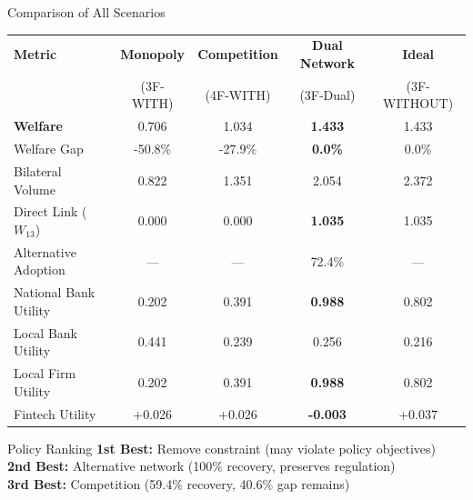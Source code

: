 \documentclass[aspectratio=169]{beamer}
\begin{document}
\begin{frame}{Comparison of All Scenarios}
    \begin{table}
        \centering
        \tiny
        \begin{tabular}{lcccc}
            \toprule
            \textbf{Metric} & \textbf{Monopoly} & \textbf{Competition} & \textbf{Dual Network} & \textbf{Ideal} \\
             & (3F-WITH) & (4F-WITH) & (3F-Dual) & (3F-WITHOUT) \\
            \midrule
            \textbf{Welfare} & 0.706 & 1.034 & \textbf{1.433} & 1.433 \\
            Welfare Gap & -50.8\% & -27.9\% & \textcolor{SafeGreen}{\textbf{0.0\%}} & 0.0\% \\
            \midrule
            Bilateral Volume & 0.822 & 1.351 & 2.054 & 2.372 \\
            Direct Link ($W_{13}$) & 0.000 & 0.000 & \textbf{1.035} & 1.035 \\
            Alternative Adoption & --- & --- & 72.4\% & --- \\
            \midrule
            National Bank Utility & 0.202 & 0.391 & \textbf{0.988} & 0.802 \\
            Local Bank Utility & 0.441 & 0.239 & 0.256 & 0.216 \\
            Local Firm Utility & 0.202 & 0.391 & \textbf{0.988} & 0.802 \\
            Fintech Utility & +0.026 & +0.026 & \textbf{-0.003} & +0.037 \\
            \bottomrule
        \end{tabular}
    \end{table}
    
    \vspace{0.3cm}
    \begin{block}{Policy Ranking}
        \textbf{1st Best:} Remove constraint (may violate policy objectives) \\
        \textbf{2nd Best:} Alternative network (100\% recovery, preserves regulation) \\
        \textbf{3rd Best:} Competition (59.4\% recovery, 40.6\% gap remains)
    \end{block}
\end{frame}
\end{document}
